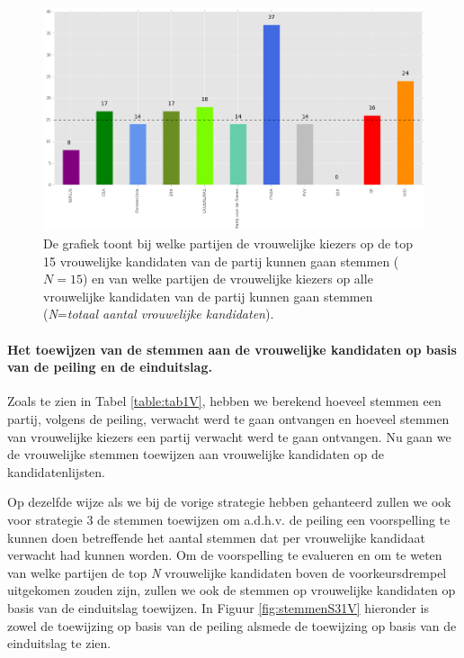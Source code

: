 \begin{figure}[H]

	\includegraphics[width=\linewidth]	{top15_of_topN_kandidaten.png}

			\caption{De grafiek toont bij welke partijen de vrouwelijke kiezers op de top 15 vrouwelijke kandidaten \citep{Kiesraad_kandidatenlijsten} van de partij kunnen gaan stemmen ($N=15$) en van welke partijen de vrouwelijke kiezers op alle vrouwelijke kandidaten van de partij kunnen gaan stemmen (\textit{N}=\textit{totaal aantal vrouwelijke kandidaten}).}  

\label{fig:15V}
\end{figure}

\paragraph{Het toewijzen van de stemmen aan de vrouwelijke kandidaten op basis van de peiling en de einduitslag.}
Zoals te zien in Tabel \ref{table:tab1V}, hebben we berekend hoeveel stemmen een partij, volgens de peiling, verwacht werd te gaan ontvangen en hoeveel stemmen van vrouwelijke kiezers een partij verwacht werd te gaan ontvangen. Nu gaan we de vrouwelijke stemmen toewijzen aan vrouwelijke kandidaten op de kandidatenlijsten. 

Op dezelfde wijze als we bij de vorige strategie hebben gehanteerd zullen we ook voor strategie 3 de stemmen toewijzen om a.d.h.v. de peiling een voorspelling te kunnen doen betreffende het aantal stemmen dat per vrouwelijke kandidaat verwacht had kunnen worden. Om de voorspelling te evalueren en om te weten van welke partijen de top \textit{N} vrouwelijke kandidaten boven de voorkeursdrempel uitgekomen zouden zijn, zullen we ook de stemmen op vrouwelijke kandidaten op basis van de einduitslag toewijzen. In Figuur \ref{fig:stemmenS31V} hieronder is zowel de toewijzing op basis van de peiling alsmede de toewijzing op basis van de einduitslag te zien.  



